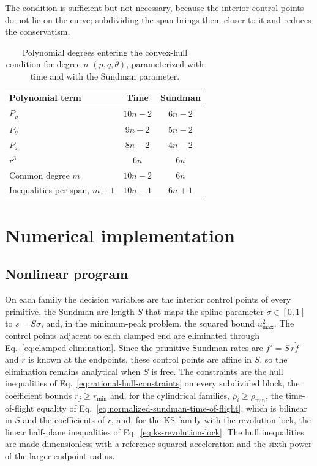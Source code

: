 \documentclass[a4paper,fleqn]{cas-sc}
\begin{document}
The condition is sufficient but not necessary, because the interior control
points do not lie on the curve; subdividing the span brings them closer to
it and reduces the conservatism.

\begin{table}[htbp]
	\centering
	\caption{Polynomial degrees entering the convex-hull condition for
		degree-$n$ $(p,q,\theta)$, parameterized with time and with the
		Sundman parameter.}
	\label{tab:hull-degrees}
	\begin{tabular}{lcc}
		\toprule
		\textbf{Polynomial term} & \textbf{Time} & \textbf{Sundman} \\
		\midrule
		$P_\rho$   & $10n-2$ & $6n-2$ \\
		$P_\theta$ & $9n-2$  & $5n-2$ \\
		$P_z$      & $8n-2$  & $4n-2$ \\
		$r^3$      & $6n$    & $6n$   \\
		\midrule
		Common degree $m$             & $10n-2$ & $6n$   \\
		Inequalities per span, $m+1$  & $10n-1$ & $6n+1$ \\
		\bottomrule
	\end{tabular}
\end{table}



\section{Numerical implementation}
\label{sec:implementation}

\subsection{Nonlinear program}

On each family the decision variables are the interior control points of
every primitive, the Sundman arc length $S$ that maps the spline parameter
$\sigma\in[0,1]$ to $s=S\sigma$, and, in the minimum-peak problem, the squared
bound $u_{\max}^2$. The control points adjacent to each clamped end are
eliminated through Eq.~\eqref{eq:clamped-elimination}. Since the primitive
Sundman rates are $f'=S\,r\dot f$ and $r$ is known at the endpoints, these
control points are affine in $S$, so the elimination remains analytical when
$S$ is free. The constraints are the hull inequalities of
Eq.~\eqref{eq:rational-hull-constraints} on every subdivided block, the
coefficient bounds $r_j\geq r_{\min}$ and, for the cylindrical families,
$\rho_i\geq\rho_{\min}$, the time-of-flight equality of
Eq.~\eqref{eq:normalized-sundman-time-of-flight}, which is bilinear in $S$ and
the coefficients of $r$, and, for the KS family with the revolution lock, the
linear half-plane inequalities of Eq.~\eqref{eq:ks-revolution-lock}. The
hull inequalities are made dimensionless with a reference squared
acceleration and the sixth power of the larger endpoint radius.
\end{document}
